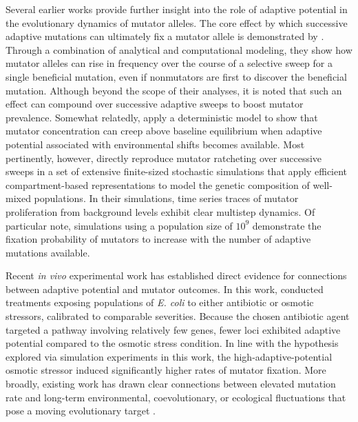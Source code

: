 Several earlier works provide further insight into the role of adaptive potential in the evolutionary dynamics of mutator alleles.
The core effect by which successive adaptive mutations can ultimately fix a mutator allele is demonstrated by \citet{tanaka2003evolution}.
Through a combination of analytical and computational modeling, they show how mutator alleles can rise in frequency over the course of a selective sweep for a single beneficial mutation, even if nonmutators are first to discover the beneficial mutation.
Although beyond the scope of their analyses, it is noted that such an effect can compound over successive adaptive sweeps to boost mutator prevalence.
Somewhat relatedly, \citet{travis2002mutator} apply a deterministic model to show that mutator concentration can creep above baseline equilibrium when adaptive potential associated with environmental shifts becomes available.
Most pertinently, however, \citet{tenaillon1999mutators} directly reproduce mutator ratcheting over successive sweeps in a set of extensive finite-sized stochastic simulations that apply efficient compartment-based representations to model the genetic composition of well-mixed populations.
In their simulations, time series traces of mutator proliferation from background levels exhibit clear multistep dynamics.
Of particular note, simulations using a population size of $10^9$ demonstrate the fixation probability of mutators to increase with the number of adaptive mutations available.

Recent \textit{in vivo} experimental work has established direct evidence for connections between adaptive potential and mutator outcomes.
In this work, \citet{callens2023mutator} conducted treatments exposing populations of \textit{E. coli} to either antibiotic or osmotic stressors, calibrated to comparable severities.
Because the chosen antibiotic agent targeted a pathway involving relatively few genes, fewer loci exhibited adaptive potential compared to the osmotic stress condition.
In line with the hypothesis explored via simulation experiments in this work, the high-adaptive-potential osmotic stressor induced significantly higher rates of mutator fixation.
More broadly, existing work has drawn clear connections between elevated mutation rate and long-term environmental, coevolutionary, or ecological fluctuations that pose a moving evolutionary target \citep{leigh1970natural,travis2002mutator,travis2004mutators,rosenbloom2014frequencydependent,pal2007coevolution,wei2022rapid}.

